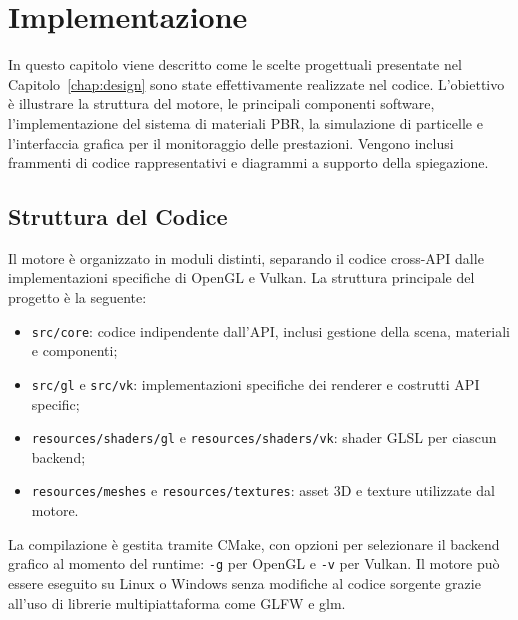 \documentclass[12pt,a4paper,openright,twoside]{book}
\begin{document}
\chapter{Implementazione}
\label{chap:implementazione}
\noindent
In questo capitolo viene descritto come le scelte progettuali presentate nel Capitolo~\ref{chap:design} sono state
effettivamente realizzate nel codice. L'obiettivo è illustrare la struttura del motore, le principali componenti
software, l'implementazione del sistema di materiali PBR, la simulazione di particelle e l'interfaccia grafica per
il monitoraggio delle prestazioni. Vengono inclusi frammenti di codice rappresentativi e diagrammi a supporto
della spiegazione.

\section{Struttura del Codice}
Il motore è organizzato in moduli distinti, separando il codice cross-API dalle implementazioni specifiche di OpenGL e
Vulkan. La struttura principale del progetto è la seguente:
\begin{itemize}
    \item \texttt{src/core}: codice indipendente dall'API, inclusi gestione della scena, materiali e componenti;
    \item \texttt{src/gl} e \texttt{src/vk}: implementazioni specifiche dei renderer e costrutti API specific;
    \item \texttt{resources/shaders/gl} e \texttt{resources/shaders/vk}: shader GLSL per ciascun backend;
    \item \texttt{resources/meshes} e \texttt{resources/textures}: asset 3D e texture utilizzate dal motore.
\end{itemize}
La compilazione è gestita tramite CMake, con opzioni per selezionare il backend grafico al momento del runtime:
\texttt{-g} per OpenGL e \texttt{-v} per Vulkan. Il motore può essere eseguito su Linux o Windows senza modifiche
al codice sorgente grazie all'uso di librerie multipiattaforma come GLFW e glm.
\end{document}
